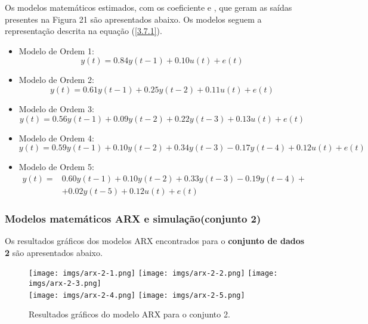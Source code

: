 \documentclass[a4paper,12pt]{article}
\begin{document}
Os modelos matemáticos estimados, com os coeficiente  e , que geram as saídas presentes na Figura 21 são apresentados abaixo. Os modelos seguem a representação descrita na equação (\ref{3.7.1}).
\begin{itemize}
    \item Modelo de Ordem 1:
    \begin{equation*}
    y(t) = 0.84y(t-1) + 0.10u(t) + e(t)
    \end{equation*}
    
    \item Modelo de Ordem 2:
    \begin{equation*}
    y(t) = 0.61y(t-1) + 0.25y(t-2) + 0.11u(t) + e(t)
    \end{equation*}
    
    \item Modelo de Ordem 3:
    \begin{equation*}
    y(t) = 0.56y(t-1) + 0.09y(t-2) + 0.22y(t-3) + 0.13u(t) + e(t)
    \end{equation*}
    
    \item Modelo de Ordem 4:
    \begin{equation*}
    y(t) = 0.59y(t-1) + 0.10y(t-2) + 0.34y(t-3) - 0.17y(t-4) + 0.12u(t) + e(t)
    \end{equation*}
    
    \item Modelo de Ordem 5:
    \begin{align}
    y(t) = &0.60y(t-1) + 0.10y(t-2) + 0.33y(t-3) - 0.19y(t-4) + \nonumber \\
    & + 0.02y(t-5) + 0.12u(t) + e(t) \nonumber
    \end{align}
\end{itemize}

\subsubsection{Modelos matemáticos ARX e simulação(conjunto 2)}

Os resultados gráficos dos modelos ARX encontrados para o \textbf{conjunto de dados 2} são apresentados abaixo.

\begin{figure}[h!]
\centering

\texttt{[image: imgs/arx-2-1.png]} \quad
\texttt{[image: imgs/arx-2-2.png]} \quad
\texttt{[image: imgs/arx-2-3.png]} \\

\texttt{[image: imgs/arx-2-4.png]} \quad
\texttt{[image: imgs/arx-2-5.png]}

\caption{Resultados gráficos do modelo ARX para o conjunto 2.}
\end{figure}
\end{document}
